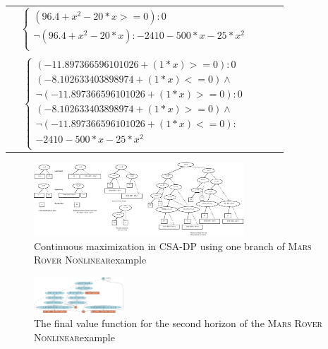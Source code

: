 \documentclass[letterpaper]{article}
\newcommand{\MarsRoverNL}{\textsc{Mars Rover Nonlinear}}
\begin{document}
{\footnotesize 
\begin{center}
\begin{tabular}{r c c c l}
&
$\begin{cases}
(96.4 + x^2 -20*x>=0): 0 \\ 
\neg(96.4 + x^2 -20*x): -2410 - 500*x - 25*x^2\\ 
  \end{cases}$
\\ \\
&
  $\begin{cases}
(-11.897366596101026 + (1 * x) >= 0): 0\\ 
(-8.102633403898974 + (1 * x) <= 0) \wedge \\
\neg(-11.897366596101026 + (1 * x) >= 0):0\\ 
(-8.102633403898974 + (1 * x) >= 0) \wedge \\
\neg(-11.897366596101026 + (1 * x)<= 0):\\
 -2410 - 500*x - 25*x^2\\ 
  \end{cases}$
\end{tabular}
\end{center}
}
\begin{figure}[t]
\begin{center}
\includegraphics[width=0.7\textwidth]{Figures1/maximum_cont_action.pdf}
\end{center}
\vspace{-3mm}
\caption{%
Continuous maximization in CSA-DP using one branch of \MarsRoverNL example\
} \label{fig:rover_algorithm}
\vspace{-3mm}
\end{figure}
\begin{figure}[t]
\begin{center}
\includegraphics[width=0.3\textwidth]{Figures1/v2.pdf}
\end{center}
\vspace{-3mm}
\caption{%
The final value function for the second horizon of the \MarsRoverNL example\
} \label{fig:rover_V2}
\vspace{-3mm}
\end{figure}
\end{document}
